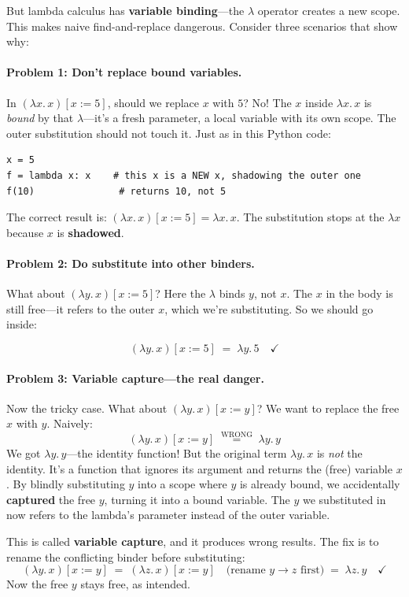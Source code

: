 \documentclass[11pt,a4paper]{article}
\theoremstyle{definition}
\newcommand{\lam}{\lambda}
\begin{document}
But lambda calculus has \textbf{variable binding}---the $\lam$ operator creates
a new scope. This makes naive find-and-replace dangerous. Consider three
scenarios that show why:

\paragraph{Problem 1: Don't replace bound variables.}
In $(\lam x.\, x)[x := 5]$, should we replace $x$ with $5$? No! The $x$ inside
$\lam x.\, x$ is \emph{bound} by that $\lam$---it's a fresh parameter, a local
variable with its own scope. The outer substitution should not touch it. Just as
in this Python code:
\begin{verbatim}
x = 5
f = lambda x: x    # this x is a NEW x, shadowing the outer one
f(10)               # returns 10, not 5
\end{verbatim}

The correct result is: $(\lam x.\, x)[x := 5] = \lam x.\, x$. The substitution
stops at the $\lam x$ because $x$ is \textbf{shadowed}.

\paragraph{Problem 2: Do substitute into other binders.}
What about $(\lam y.\, x)[x := 5]$? Here the $\lam$ binds $y$, not $x$. The
$x$ in the body is still free---it refers to the outer $x$, which we're
substituting. So we should go inside:

\[
  (\lam y.\, x)[x := 5] \;=\; \lam y.\, 5 \quad\checkmark
\]

\paragraph{Problem 3: Variable capture---the real danger.}
Now the tricky case. What about $(\lam y.\, x)[x := y]$? We want to replace the
free $x$ with $y$. Naively:
\[
  (\lam y.\, x)[x := y] \;\overset{\text{WRONG}}{=}\; \lam y.\, y
\]
We got $\lam y.\, y$---the identity function! But the original term
$\lam y.\, x$ is \emph{not} the identity. It's a function that ignores its
argument and returns the (free) variable $x$. By blindly substituting $y$
into a scope where $y$ is already bound, we accidentally \textbf{captured} the
free $y$, turning it into a bound variable. The $y$ we substituted in now refers
to the lambda's parameter instead of the outer variable.

This is called \textbf{variable capture}, and it produces wrong results. The
fix is to rename the conflicting binder before substituting:
\[
  (\lam y.\, x)[x := y]
    \;=\; (\lam z.\, x)[x := y]     \quad\text{(rename $y \to z$ first)}
    \;=\; \lam z.\, y               \quad\checkmark
\]
Now the free $y$ stays free, as intended.
\end{document}
